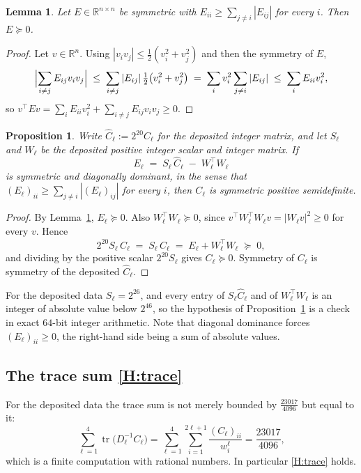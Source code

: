 \documentclass[reqno]{amsart}
\newtheorem{lemma}[theorem]{Lemma}
\newtheorem{proposition}[theorem]{Proposition}
\theoremstyle{definition}
\DeclareMathOperator{\tr}{tr}
\newcommand{\R}{\mathbb{R}}
\begin{document}
\begin{lemma}\label{lem:domPSD}
Let $E\in\R^{n\times n}$ be symmetric with
$E_{ii}\ge\sum_{j\ne i}|E_{ij}|$ for every $i$. Then $E\succeq0$.
\end{lemma}
\begin{proof}
Let $v\in\R^{n}$. Using $|v_iv_j|\le\tfrac12(v_i^{2}+v_j^{2})$ and then the symmetry of $E$,
\[
\Bigl|\sum_{i\ne j}E_{ij}v_iv_j\Bigr|
\;\le\;\sum_{i\ne j}|E_{ij}|\,\tfrac12\bigl(v_i^{2}+v_j^{2}\bigr)
\;=\;\sum_{i}v_i^{2}\sum_{j\ne i}|E_{ij}|
\;\le\;\sum_{i}E_{ii}v_i^{2},
\]
so $v^{\top}Ev=\sum_i E_{ii}v_i^{2}+\sum_{i\ne j}E_{ij}v_iv_j\ge0$.
\end{proof}

\begin{proposition}\label{prop:psd}
Write $\widehat C_\ell:=2^{20}C_\ell$ for the deposited integer matrix, and let $S_\ell$ and
$W_\ell$ be the deposited positive integer scalar and integer matrix. If
\[
E_\ell\;=\;S_\ell\,\widehat C_\ell\;-\;W_\ell^{\top}W_\ell
\]
is symmetric and diagonally dominant, in the sense that
$(E_\ell)_{ii}\ge\sum_{j\ne i}|(E_\ell)_{ij}|$ for every $i$, then $C_\ell$ is symmetric positive
semidefinite.
\end{proposition}
\begin{proof}
By Lemma~\ref{lem:domPSD}, $E_\ell\succeq0$. Also $W_\ell^{\top}W_\ell\succeq0$, since
$v^{\top}W_\ell^{\top}W_\ell v=|W_\ell v|^{2}\ge0$ for every $v$. Hence
\[
2^{20}S_\ell\,C_\ell\;=\;S_\ell\,\widehat C_\ell\;=\;E_\ell+W_\ell^{\top}W_\ell\;\succeq\;0,
\]
and dividing by the positive scalar $2^{20}S_\ell$ gives $C_\ell\succeq0$. Symmetry of $C_\ell$ is
symmetry of the deposited $\widehat C_\ell$.
\end{proof}

For the deposited data $S_\ell=2^{26}$, and every entry of $S_\ell\widehat C_\ell$ and of
$W_\ell^{\top}W_\ell$ is an integer of absolute value below $2^{46}$, so the hypothesis of
Proposition~\ref{prop:psd} is a check in exact $64$-bit integer arithmetic. Note that diagonal
dominance forces $(E_\ell)_{ii}\ge0$, the right-hand side being a sum of absolute values.

\subsection{The trace sum \ref{H:trace}}\label{subsec:trace}

For the deposited data the trace sum is not merely bounded by $\tfrac{23017}{4096}$ but equal to it:
\begin{equation}\label{eq:trsumcheck}
\sum_{\ell=1}^{4}\tr\bigl(D_\ell^{-1}C_\ell\bigr)
=\sum_{\ell=1}^{4}\sum_{i=1}^{2\ell+1}\frac{(C_\ell)_{ii}}{w^\ell_i}=\frac{23017}{4096},
\end{equation}
which is a finite computation with rational numbers. In particular \ref{H:trace} holds.
\end{document}
